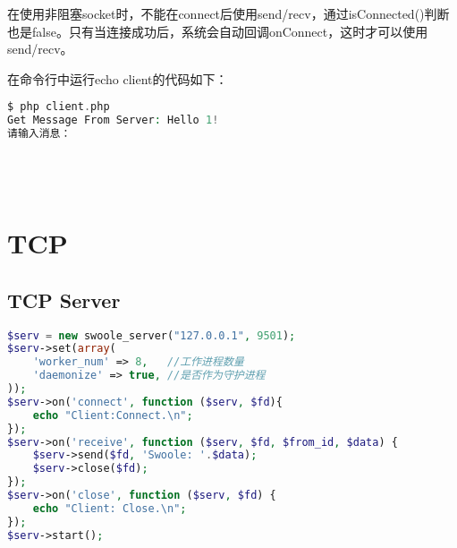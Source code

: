 在使用非阻塞socket时，不能在connect后使用send/recv，通过isConnected()判断也是false。只有当连接成功后，系统会自动回调onConnect，这时才可以使用send/recv。

在命令行中运行echo client的代码如下：



\begin{lstlisting}[language=PHP]
$ php client.php
Get Message From Server: Hello 1!
请输入消息：
\end{lstlisting}




\begin{lstlisting}[language=PHP]

\end{lstlisting}




\begin{lstlisting}[language=PHP]

\end{lstlisting}




\begin{lstlisting}[language=PHP]

\end{lstlisting}




\begin{lstlisting}[language=PHP]

\end{lstlisting}






\chapter{TCP}

\section{TCP Server}





\begin{lstlisting}[language=PHP]
$serv = new swoole_server("127.0.0.1", 9501);
$serv->set(array(
    'worker_num' => 8,   //工作进程数量
    'daemonize' => true, //是否作为守护进程
));
$serv->on('connect', function ($serv, $fd){
    echo "Client:Connect.\n";
});
$serv->on('receive', function ($serv, $fd, $from_id, $data) {
    $serv->send($fd, 'Swoole: '.$data);
    $serv->close($fd);
});
$serv->on('close', function ($serv, $fd) {
    echo "Client: Close.\n";
});
$serv->start();
\end{lstlisting}





